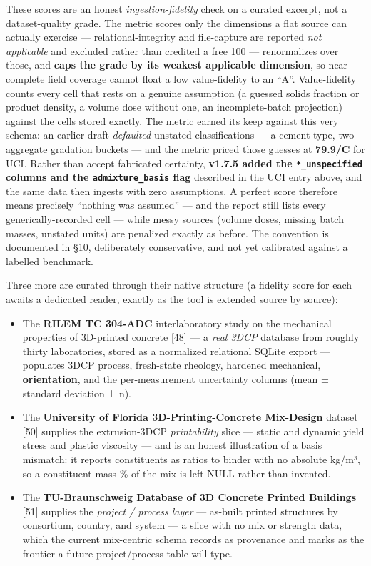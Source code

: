 \documentclass[
  11pt,
  letterpaper,
]{article}
\providecommand{\tightlist}{%
  \setlength{\itemsep}{0pt}\setlength{\parskip}{0pt}}
\begin{document}
These scores are an honest \emph{ingestion-fidelity} check on a curated
excerpt, not a dataset-quality grade. The metric scores only the
dimensions a flat source can actually exercise --- relational-integrity
and file-capture are reported \emph{not applicable} and excluded rather
than credited a free 100 --- renormalizes over those, and \textbf{caps
the grade by its weakest applicable dimension}, so near-complete field
coverage cannot float a low value-fidelity to an ``A''. Value-fidelity
counts every cell that rests on a genuine assumption (a guessed solids
fraction or product density, a volume dose without one, an
incomplete-batch projection) against the cells stored exactly. The
metric earned its keep against this very schema: an earlier draft
\emph{defaulted} unstated classifications --- a cement type, two
aggregate gradation buckets --- and the metric priced those guesses at
\textbf{79.9/C} for UCI. Rather than accept fabricated certainty,
\textbf{v1.7.5 added the \texttt{*\_unspecified} columns and the
\texttt{admixture\_basis} flag} described in the UCI entry above, and
the same data then ingests with zero assumptions. A perfect score
therefore means precisely ``nothing was assumed'' --- and the report
still lists every generically-recorded cell --- while messy sources
(volume doses, missing batch masses, unstated units) are penalized
exactly as before. The convention is documented in §10, deliberately
conservative, and not yet calibrated against a labelled benchmark.

Three more are curated through their native structure (a fidelity score
for each awaits a dedicated reader, exactly as the tool is extended
source by source):

\begin{itemize}
\tightlist
\item
  The \textbf{RILEM TC 304-ADC} interlaboratory study on the mechanical
  properties of 3D-printed concrete {[}48{]} --- a \emph{real 3DCP}
  database from roughly thirty laboratories, stored as a normalized
  relational SQLite export --- populates 3DCP process, fresh-state
  rheology, hardened mechanical, \textbf{orientation}, and the
  per-measurement uncertainty columns (mean ± standard deviation ± n).
\item
  The \textbf{University of Florida 3D-Printing-Concrete Mix-Design}
  dataset {[}50{]} supplies the extrusion-3DCP \emph{printability} slice
  --- static and dynamic yield stress and plastic viscosity --- and is
  an honest illustration of a basis mismatch: it reports constituents as
  ratios to binder with no absolute kg/m³, so a constituent mass-\% of
  the mix is left NULL rather than invented.
\item
  The \textbf{TU-Braunschweig Database of 3D Concrete Printed Buildings}
  {[}51{]} supplies the \emph{project / process layer} --- as-built
  printed structures by consortium, country, and system --- a slice with
  no mix or strength data, which the current mix-centric schema records
  as provenance and marks as the frontier a future project/process table
  will type.
\end{itemize}
\end{document}

